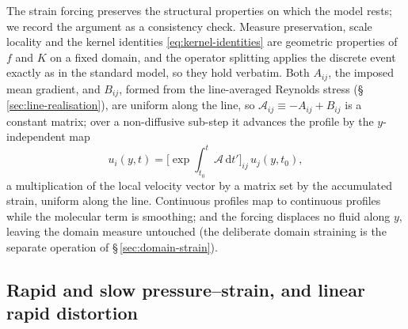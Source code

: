 \documentclass[lineno]{JFM-FLM_Au}
\begin{document}
The strain forcing preserves the structural properties on which the model
rests; we record the argument as a consistency check. Measure
preservation, scale locality and the kernel identities
\eqref{eq:kernel-identities} are geometric properties of $f$ and $K$
on a fixed domain, and the operator splitting applies the discrete
event exactly as in the standard model, so they hold verbatim. Both
$A_{ij}$, the imposed mean gradient, and $B_{ij}$, formed from the
line-averaged Reynolds stress (\S\,\ref{sec:line-realisation}), are
uniform along the line, so $\mathcal{A}_{ij}\equiv-A_{ij}+B_{ij}$ is a
constant matrix; over a non-diffusive sub-step it advances the profile
by the $y$-independent map
\begin{equation}
  u_i(y,t)=\Big[\exp\!\int_{t_0}^{t}\mathcal{A}\,\mathrm{d}t'\Big]_{ij}\,
  u_j(y,t_0),
  \label{eq:strain-map}
\end{equation}
a multiplication of the local velocity vector by a matrix set by the
accumulated strain, uniform along the line. Continuous profiles map
to continuous profiles while the molecular term is smoothing; and the
forcing displaces no fluid along $y$, leaving the domain measure
untouched (the deliberate domain straining is the separate operation
of \S\,\ref{sec:domain-strain}).

\subsection{Rapid and slow pressure--strain, and linear rapid
distortion}\label{sec:rapid-slow}
\end{document}

